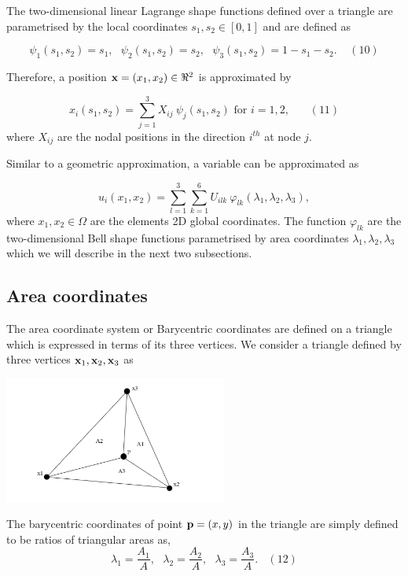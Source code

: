 The two-\/dimensional linear Lagrange shape functions defined over a triangle are parametrised by the local coordinates $ s_1,s_2 \in [0,1]$ and are defined as

\[ \psi_{1}(s_1,s_2) = s_1, \ \ \ \psi_{2}(s_1,s_2) = s_2, \ \ \ \psi_{3}(s_1,s_2) = 1-s_1-s_2. \ \ \ \ \ (10)\]

Therefore, a position $ {\bf x} = (x_1,x_2) \in \Re^2 $ is approximated by

\[ x_i(s_1,s_2) = \sum_{j=1}^{3} X_{ij} \ \psi_{j}(s_1,s_2) \mbox{\ \ \ for $i=1,2$}, \ \ \ \ \ \ \ \ (11) \] where $ X_{ij} $ are the nodal positions in the direction $ i^{th} $ at node $ j $.

Similar to a geometric approximation, a variable can be approximated as

\[ u_i(x_1,x_2) = \sum_{l=1}^{3} \sum_{k=1}^{6}U_{ilk} \ \varphi_{lk}(\lambda_1,\lambda_2,\lambda_3), \] where $ x_1,x_2 \in \Omega $ are the element\textquotesingle{}s 2D global coordinates. The function $ \varphi_{lk}$ are the two-\/dimensional Bell shape functions parametrised by area coordinates $ \lambda_1, \lambda_2, \lambda_3$ which we will describe in the next two subsections.



\hypertarget{index_area_coor}{}\subsection{Area coordinates}\label{index_area_coor}
The area coordinate system or Barycentric coordinates are defined on a triangle which is expressed in terms of its three vertices. We consider a triangle defined by three vertices $ {\bf x}_{1}, {\bf x}_{2}, {\bf x}_{3}$ as

 
\begin{DoxyImage}
\includegraphics[width=0.55\textwidth]{triangle}
\end{DoxyImage}


The barycentric coordinates of point $ {\bf p} = (x,y)$ in the triangle are simply defined to be ratios of triangular areas as, \[ \lambda_1 = \frac{A_1}{A}, \ \ \ \lambda_2 = \frac{A_2}{A}, \ \ \ \lambda_3 = \frac{A_3}{A}. \ \ \ \ (12) \]

